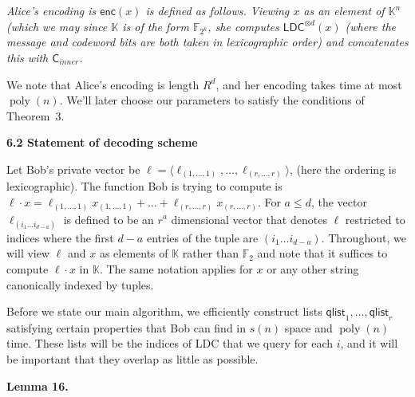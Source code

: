 \documentclass[10pt,a4paper]{article}
\begin{document}
\emph{Alice’s encoding is $\mathsf{enc}(x)$ is defined as follows. Viewing $x$ as an element of $\mathbb{K}^{n}$ (which we may since $\mathbb{K}$ is of the form $\mathbb{F}_{2^{k}}$, she computes $\mathsf{LDC}^{\otimes d}(x)$ (where the message and codeword bits are both taken in lexicographic order) and concatenates this with $\mathsf{C}_{inner}$.}\par






We note that Alice’s encoding is length $R^{d}$, and her encoding takes time at most $\operatorname{poly}(n)$. We’ll later choose our parameters to satisfy the conditions of Theorem 3.\par





\par\medskip\noindent\textbf{
6.2 Statement of decoding scheme}\par




Let Bob’s private vector be $\ell=\langle\ell_{(1,\ldots,1)},\ldots,\ell_{(r,\ldots,r)}\rangle$, (here the ordering is lexicographic). The function Bob is trying to compute is $\ell\cdot x=\ell_{(1,\ldots,1)}x_{(1,\ldots,1)}+\ldots+\ell_{(r,\ldots,r)}x_{(r,\ldots,r)}$. For $a\leq d$, the vector $\ell_{(i_{1}\ldots i_{d-a})}$ is defined to be an $r^{a}$ dimensional vector that denotes $\ell$ restricted to indices where the first $d-a$ entries of the tuple are $(i_{1}\ldots i_{d-a})$. Throughout, we will view $\ell$ and $x$ as elements of $\mathbb{K}$ rather than $\mathbb{F}_{2}$ and note that it suffices to compute $\ell\cdot x$ in $\mathbb{K}$.
The same notation applies for $x$ or any other string canonically indexed by tuples.\par




Before we state our main algorithm, we efficiently construct lists $\mathsf{qlist}_{1},\ldots,\mathsf{qlist}_{r}$ satisfying certain properties that Bob can find in $s(n)$ space and $\operatorname{poly}(n)$ time. These lists will be the indices of LDC that we query for each $i$, and it will be important that they overlap as little as possible.\par





\par\medskip\noindent\textbf{
\textbf{Lemma 16}\textbf{.}
}\par
\end{document}
